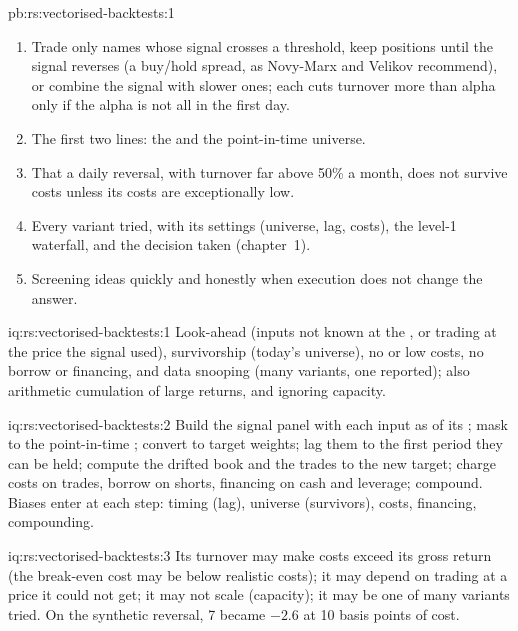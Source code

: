\begin{solution}{pb:rs:vectorised-backtests:1}
\begin{enumerate}
\item Trade only names whose signal crosses a threshold, keep positions until the signal reverses (a buy/hold spread, as Novy-Marx and Velikov recommend),
or combine the signal with slower ones; each cuts turnover more than alpha only if the alpha is not all in the first day.
\item The first two lines: the  and the point-in-time universe.
\item That a daily reversal, with turnover far above 50\% a month, does not survive costs unless its costs are exceptionally low.
\item Every variant tried, with its settings (universe, lag, costs), the level-1 waterfall, and the decision taken (chapter~1).
\item Screening ideas quickly and honestly when execution does not change the answer.
\end{enumerate}
\end{solution}

\begin{solution}{iq:rs:vectorised-backtests:1}
Look-ahead (inputs not known at the , or trading at the price the signal used), survivorship (today's universe), no or low costs, no borrow or
financing, and data snooping (many variants, one reported); also arithmetic cumulation of large returns, and ignoring capacity.
\end{solution}

\begin{solution}{iq:rs:vectorised-backtests:2}
Build the signal panel with each input as of its ; mask to the point-in-time ; convert to target weights; lag them to the
first period they can be held; compute the drifted book and the trades to the new target; charge costs on trades, borrow on shorts, financing on cash and
leverage; compound. Biases enter at each step: timing (lag), universe (survivors), costs, financing, compounding.
\end{solution}

\begin{solution}{iq:rs:vectorised-backtests:3}
Its turnover may make costs exceed its gross return (the break-even cost may be below realistic costs); it may depend on trading at a price it could not
get; it may not scale (capacity); it may be one of many variants tried. On the synthetic reversal, 7 became $-2.6$ at 10 basis points of cost.
\end{solution}

